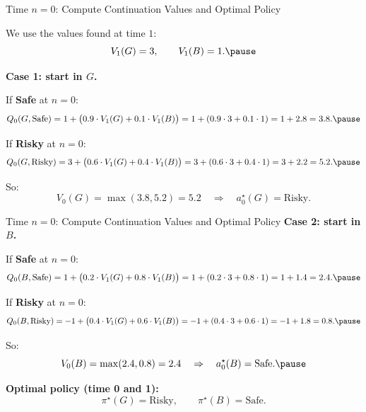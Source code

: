 \documentclass[aspectratio=169]{beamer}
\begin{document}
\begin{frame}{Time $n=0$: Compute Continuation Values and Optimal Policy}

We use the values found at time $1$:
\[
V_1(G)=3,\qquad V_1(B)=1.\pause
\vspace{-6mm}
\]

\textbf{Case 1: start in $G$.}

If \textbf{Safe} at $n=0$:
\[
Q_0(G,\text{Safe})=1+\big(0.9\cdot V_1(G)+0.1\cdot V_1(B)\big)
=1+(0.9\cdot 3+0.1\cdot 1)=1+2.8=3.8.\pause
\vspace{-5mm}
\]

If \textbf{Risky} at $n=0$:
\[
Q_0(G,\text{Risky})=3+\big(0.6\cdot V_1(G)+0.4\cdot V_1(B)\big)
=3+(0.6\cdot 3+0.4\cdot 1)=3+2.2=5.2.\pause
\vspace{-5mm}
\]

So:
\[
V_0(G)=\max(3.8,5.2)=5.2
\quad\Rightarrow\quad a_0^\star(G)=\text{Risky}.
\]
\end{frame}

\begin{frame}{Time $n=0$: Compute Continuation Values and Optimal Policy}
\textbf{Case 2: start in $B$.}

If \textbf{Safe} at $n=0$:
\[
Q_0(B,\text{Safe})=1+\big(0.2\cdot V_1(G)+0.8\cdot V_1(B)\big)
=1+(0.2\cdot 3+0.8\cdot 1)=1+1.4=2.4.\pause
\vspace{-5mm}
\]

If \textbf{Risky} at $n=0$:
\[
Q_0(B,\text{Risky})=-1+\big(0.4\cdot V_1(G)+0.6\cdot V_1(B)\big)
=-1+(0.4\cdot 3+0.6\cdot 1)=-1+1.8=0.8.\pause
\vspace{-5mm}
\]

So:
\[
V_0(B)=\max(2.4,0.8)=2.4
\quad\Rightarrow\quad a_0^\star(B)=\text{Safe}.\pause
\vspace{-3mm}
\]

\textbf{Optimal policy (time 0 and 1):}
\[
\pi^\star(G)=\text{Risky},\qquad \pi^\star(B)=\text{Safe}.
\]
\end{frame}
\end{document}
